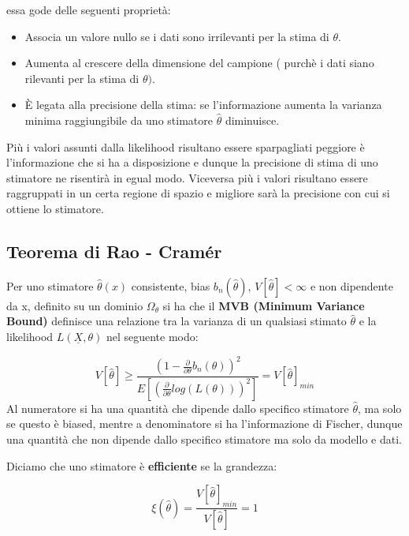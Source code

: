 \noindent essa gode delle seguenti propriet\`{a}:

\begin{itemize}
	\item Associa un valore nullo se i dati sono irrilevanti per la stima di $\theta$.
	\item Aumenta al crescere della dimensione del campione ( purch\`{e} i dati siano rilevanti per la stima di $\theta)$.
	\item \`{E} legata alla precisione della stima: se l'informazione aumenta la varianza minima raggiungibile da uno stimatore $\hat{\theta}$ diminuisce.
\end{itemize}

\noindent Pi\`{u} i valori assunti dalla likelihood risultano essere sparpagliati peggiore \`{e} l'informazione che si ha a disposizione e dunque la precisione di stima di uno stimatore ne risentir\`{a} in egual modo. Viceversa pi\`{u} i valori risultano essere raggruppati in un certa regione di spazio e migliore sar\`{a} la precisione con cui si ottiene lo stimatore.

\subsection{Teorema di Rao - Cram\'{e}r}

Per uno stimatore $\hat{\theta}(x)$ consistente, bias $b_n(\hat{\theta})$, $V[\hat{\theta}] < \infty$ e non dipendente da x, definito su un dominio $\Omega_{\theta}$ si ha che il \textbf{MVB (Minimum Variance Bound)} definisce una relazione tra la varianza di un qualsiasi stimato $\hat{\theta}$ e la likelihood $L(\underline{X},\theta)$ nel seguente modo:

\begin{equation}
	V[\hat{\theta}] \geq \frac{(1-\frac{\partial}{\partial \theta}b_n(\theta))^2}{E[(\frac{\partial}{\partial \theta}log(L(\theta)))^2]} = V[\hat{\theta}]_{min}
\end{equation}
\newline
\noindent Al numeratore si ha una quantit\`{a} che dipende dallo specifico stimatore $\hat{\theta}$, ma solo se questo \`{e} biased, mentre a denominatore si ha l'informazione di Fischer, dunque una quantit\`{a} che non dipende dallo specifico stimatore ma solo da modello e dati.
\newline

\noindent Diciamo che uno stimatore \`{e} \textbf{efficiente} se la grandezza:

\begin{equation}
	\xi(\hat{\theta}) = \frac{V[\hat{\theta}]_{min}}{V[\hat{\theta}]} = 1
\end{equation}
	
